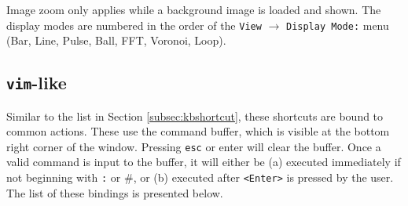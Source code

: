 \documentclass[english]{article}
\providecommand{\mi}[1]{\texttt{#1}}
\begin{document}
\vspace{1em}

Image zoom only applies while a background image is loaded and shown.
The display modes are numbered in the order of the \mi{View} $\rightarrow$ \mi{Display Mode:} menu
(Bar, Line, Pulse, Ball, FFT, Voronoi, Loop).

\newpage

\subsection{\mi{vim}-like}

Similar to the list in Section \textcolor{lcol}{\hyperref[subsec:kbshortcut]{\ref{subsec:kbshortcut}}}, these shortcuts are bound to common actions. These use the command 
buffer, which is visible at the bottom right corner of the window. Pressing \mi{esc} or enter will clear the buffer. Once a 
valid command is input to the buffer, it will either be (a) executed immediately if not beginning with \mi{:} or \#, or 
(b) executed after \mi{<Enter>} is pressed by the user. The list of these bindings is presented below. 

\vspace{1em}
\end{document}
